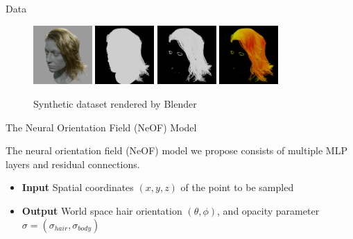 \documentclass[final]{beamer}
\newlength{\colwidth}
\begin{document}
\begin{frame}[t]
\begin{columns}[t]
\begin{column}{\colwidth}
\begin{block}{Data}
    \begin{figure}[h]
        \includegraphics[width=0.2\textwidth]{project-final-paper/images/dataset/0009_rendered.png}
        \includegraphics[width=0.2\textwidth]{project-final-paper/images/dataset/0009_bodymask.png}
        \centering
        \includegraphics[width=0.2\textwidth]{project-final-paper/images/dataset/0009_hairmask.png}
        \includegraphics[width=0.2\textwidth]{project-final-paper/images/dataset/0009_hairdir.png}
    
        \caption{Synthetic dataset rendered by Blender}
        \label{fig:dataset}
    \end{figure}    

  \end{block}

  \begin{alertblock}{The Neural Orientation Field (NeOF) Model}

    The neural orientation field (NeOF) model we propose consists of multiple MLP layers and residual connections.
    
    \begin{itemize}
      \item \textbf{Input} Spatial coordinates $(x, y, z)$ of the point to be sampled
      \item \textbf{Output} World space hair orientation $(\theta, \phi)$, and opacity parameter $\sigma = (\sigma_{hair}, \sigma_{body})$
    \end{itemize}


\end{alertblock}
\end{column}
\end{columns}
\end{frame}
\end{document}
